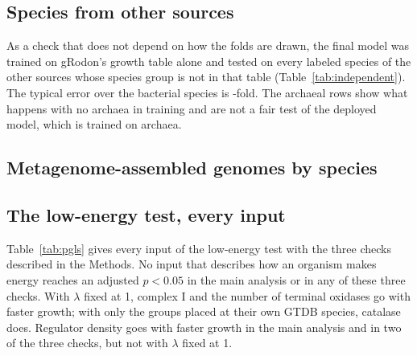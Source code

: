 

\subsection{Species from other sources}
As a check that does not depend on how the folds are drawn, the final model was trained on gRodon's growth table alone and
tested on every labeled species of the other sources whose species group is not in that table (Table~\ref{tab:independent}).
The typical error over the \IndepN bacterial species is \IndepErr-fold. The archaeal rows show what happens with no archaea
in training and are not a fair test of the deployed model, which is trained on archaea.



\subsection{Metagenome-assembled genomes by species}


\subsection{The low-energy test, every input}
Table~\ref{tab:pgls} gives every input of the low-energy test with the three checks described in the Methods. No input that
describes how an organism makes energy reaches an adjusted $p<0.05$ in the main analysis or in any of these three checks. With $\lambda$
fixed at 1, complex I and the number of terminal oxidases go with faster growth; with only the groups placed at their own
GTDB species, catalase does. Regulator density goes with faster growth in the main analysis and in two of the three checks,
but not with $\lambda$ fixed at 1.


